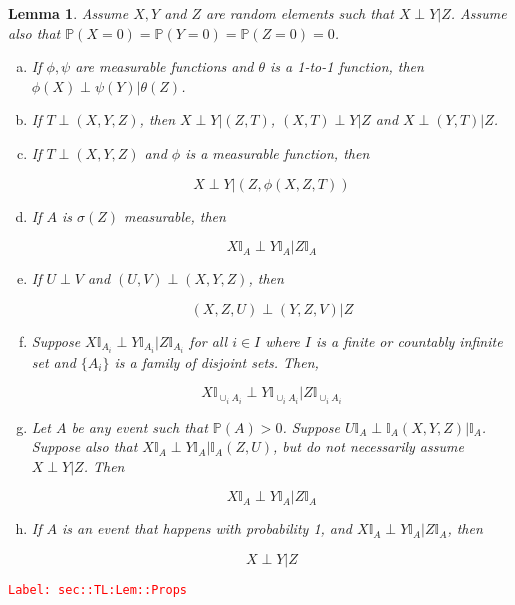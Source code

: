 \documentclass[12pt]{article}
\newcommand{\mb}{\mathbb}
\newcommand{\tr}{\textcolor{red}}
\newcommand{\labe}[1]{\tr{\texttt{Label: #1}}}
\newcommand{\pr}{\mb{P}}							%
\newtheorem{lem}[thms]{Lemma}
\begin{document}
\begin{lem}
Assume \(X,Y\) and \(Z\) are random elements such that \(X\perp Y|Z\). Assume also that \(\pr(X=0) = \pr(Y=0) = \pr(Z=0) = 0\).

\begin{enumerate}[(a)]
\item If \(\phi,\psi\) are measurable functions and \(\theta\) is a 1-to-1 function, then \(\phi(X)\perp \psi(Y)|\theta(Z)\).

\item If \(T\perp(X,Y,Z)\), then \(X\perp Y|(Z,T)\), \((X,T)\perp Y|Z\) and \(X\perp (Y,T)|Z\).

\item If \(T\perp (X,Y,Z)\) and \(\phi\) is a measurable function, then

\[X\perp Y|(Z,\phi(X,Z,T))\]

\item If \(A\) is \(\sigma(Z)\) measurable, then 

\[X\mb{I}_A\perp Y\mb{I}_A|Z\mb{I}_A\]

\item If \(U\perp V\) and \((U,V)\perp(X,Y,Z)\), then 

\[(X,Z,U)\perp (Y,Z,V)|Z\]

\item Suppose \(X\mb{I}_{A_i}\perp Y\mb{I}_{A_i}|Z\mb{I}_{A_i}\) for all \(i\in I\) where \(I\) is a finite or countably infinite set and \(\{A_i\}\) is a family of disjoint sets. Then,

\[X\mb{I}_{\cup_i A_i}\perp Y\mb{I}_{\cup_i A_i}|Z\mb{I}_{\cup_i A_i}\]

\item Let \(A\) be any event such that \(\pr(A) > 0\). Suppose \(U\mb{I}_A\perp \mb{I}_A(X,Y,Z)|\mb{I}_A\). Suppose also that \(X\mb{I}_A\perp Y\mb{I}_A|\mb{I}_A(Z,U)\), but do not necessarily assume \(X\perp Y|Z\). Then 

\[X\mb{I}_A\perp Y\mb{I}_A|Z\mb{I}_A\]

\item If \(A\) is an event that happens with probability 1, and \(X\mb{I}_A \perp Y\mb{I}_A |Z\mb{I}_A\), then 

\[X\perp Y |Z\]
\end{enumerate}
\label{sec::TL:Lem::Props}
\end{lem}
\labe{sec::TL:Lem::Props}
\end{document}
